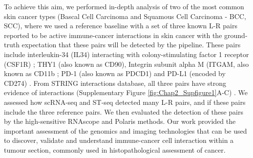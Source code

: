 To achieve this aim, we performed in-depth analysis of two of the most common skin cancer types (Bascal Cell Carcinoma and Squamous Cell Carcinoma - BCC, SCC), where we used a reference baseline with a set of three known L-R pairs reported to be active immune-cancer interactions in skin cancer with the ground-truth expectation that these pairs will be detected by the pipeline. These pairs include interleukin-34 (IL34) interacting with colony-stimulating factor 1 receptor (CSF1R) \cite{lin2008discovery};  THY1 (also known as CD90), Integrin subunit alpha M (ITGAM, also known as CD11b \cite{wetzel2004human}; PD-1 (also known as PDCD1) and PD-L1 (encoded by CD274) \cite{pardoll2012blockade}. From STRING interactions database, all three pairs have strong evidence of interactions (Supplementary Figure \ref{fig:Chap2_Supfigure1}A-C) \cite{jensen2009string}. We assessed how scRNA-seq and ST-seq detected many L-R pairs, and if these pairs include the three reference pairs. We then evaluated the detection of these pairs by the high-sensitive RNAscope and Polaris methods. Our work provided the important assessment of the genomics and imaging technologies that can be used to discover, validate and understand immune-cancer cell interaction within a tumour section, commonly used in histopathological assessment of cancer. 
